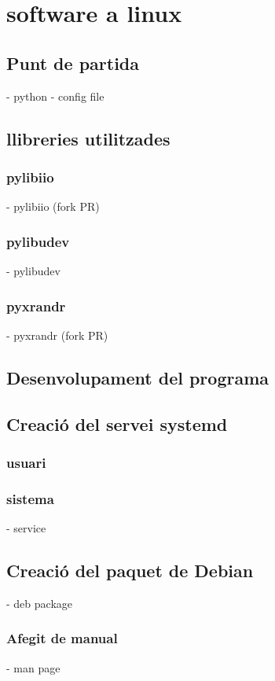 \chapter{software a linux}
\section{Punt de partida}
- python
- config file
\section{llibreries utilitzades}
\subsection{pylibiio}
- pylibiio (fork PR)
\subsection{pylibudev}
- pylibudev
\subsection{pyxrandr}
- pyxrandr (fork PR)
\section{Desenvolupament del programa}
\section{Creació del servei systemd}
\subsection{usuari}
\subsection{sistema}
- service
\section{Creació del paquet de Debian}
- deb package
\subsection{Afegit de manual}
- man page
